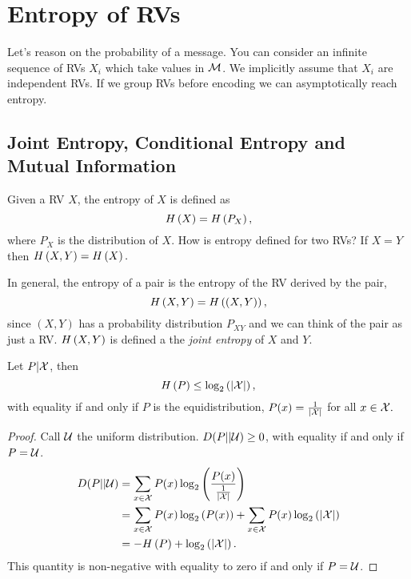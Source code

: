 
\chapter{Entropy of \aclp{RV}}

Let's reason on the probability of a message.
You can consider an infinite sequence of \acp{RV} $X_i$ which take values in $\mathcal{M}$.
We implicitly assume that $X_i$ are independent \acp{RV}.
If we group \acp{RV} before encoding we can asymptotically reach entropy.

\section{Joint Entropy, Conditional Entropy and Mutual Information}

Given a \ac{RV} $X$, the entropy of $X$ is defined as
\begin{equation*}
	H\left({X}\right) = H\left({P_X}\right),
\end{equation*}
where $P_X$ is the distribution of $X$.
How is entropy defined for two \acp{RV}?
If $X = Y$ then $H\left({X,Y}\right) = H\left({X}\right).$

\begin{definition}
	In general, the entropy of a pair is the entropy of the \ac{RV} derived by the pair, \ie
	\begin{equation*}
		H\left({X,Y}\right) = H\left({(X,Y)}\right), 
	\end{equation*}
	since $(X, Y)$ has a probability distribution $P_{XY}$ and we can think of the pair as just a \ac{RV}.
	$H\left({X,Y}\right)$ is defined a the \emph{joint entropy} of $X$ and $Y$. 
\end{definition}

\begin{prop}
	Let $P | \mathcal{X}$, then
	\begin{equation*}
		H\left({P}\right) \le \log_2 \left( \left|{\mathcal{X}}\right| \right),
	\end{equation*}
	with equality if and only if $P$ is the equidistribution, \ie $P(x) = \frac{1}{\left|{\mathcal{X}}\right|}$ for all $x \in \mathcal{X}.$
\end{prop}

\begin{proof}
	Call $\mathcal{U}$ the uniform distribution.
	$D(P||\mathcal{U})\ge 0$, with equality if and only if $P = \mathcal{U}$.
	\begin{align*}
		D(P||\mathcal{U})
		& =
		\sum_{x \in \mathcal{X}} P(x) \log_2 \left( \frac{P(x)}{\frac{1}{\left|{\mathcal{X}}\right|}} \right)
		\\
		& =
		\sum_{x \in \mathcal{X}} P(x) \log_2 \left( P(x) \right)
		+
		\sum_{x \in \mathcal{X}} P(x) \log_2 \left( \left|{\mathcal{X}}\right| \right)
		\\
		& =
		-H\left({P}\right) + \log_2 \left( \left|{\mathcal{X}}\right| \right).
	\end{align*}
	This quantity is non-negative with equality to zero if and only if $P = \mathcal{U}$.
\end{proof}


